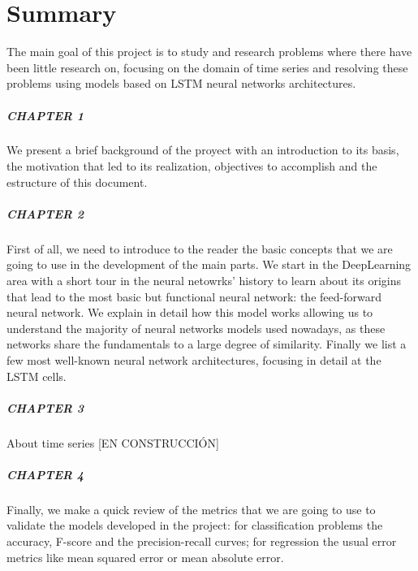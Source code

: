 %

\chapter*{Summary}\label{ch:summary}

The main goal of this project is to study and research problems where there have been little research on, focusing on the domain of time series and resolving these problems using models based on LSTM neural networks architectures.

\paragraph{CHAPTER 1} We present a brief background of the proyect with an introduction to its basis, the motivation that led to its realization, objectives to accomplish and the estructure of this document.

\paragraph{CHAPTER 2} First of all, we need to introduce to the reader the basic concepts that we are going to use in the development of the main parts. We start in the DeepLearning area with a short tour in the neural netowrks' history to learn about its origins that lead to the most basic but functional neural network: the feed-forward neural network. We explain in detail how this model works allowing us to understand the majority of neural networks models used nowadays, as these networks share the fundamentals to a large degree of similarity. Finally we list a few most well-known neural network architectures, focusing in detail at the LSTM cells.

\paragraph{CHAPTER 3} About time series [EN CONSTRUCCIÓN]

\paragraph{CHAPTER 4} Finally, we make a quick review of the metrics that we are going to use to validate the models developed in the project: for classification problems the accuracy, F-score and the precision-recall curves; for regression the usual error metrics like mean squared error or mean absolute error.

